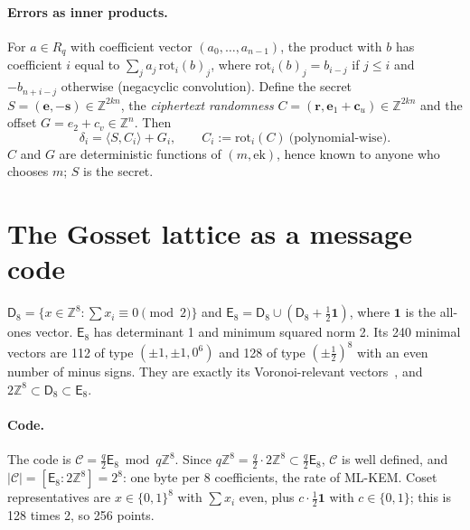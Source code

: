 \documentclass[11pt,a4paper]{article}
\theoremstyle{definition}
\theoremstyle{remark}
\newcommand{\Z}{\mathbb{Z}}
\newcommand{\E}{\mathsf{E}_8}
\newcommand{\D}{\mathsf{D}_8}
\newcommand{\rot}{\mathrm{rot}}
\begin{document}
\paragraph{Errors as inner products.} For $a\in R_q$ with coefficient vector $(a_0,\dots,a_{n-1})$, the product with $b$ has coefficient $i$ equal to $\sum_j a_j\,\rot_i(b)_j$, where $\rot_i(b)_j=b_{i-j}$ if $j\le i$ and $-b_{n+i-j}$ otherwise (negacyclic convolution). Define the secret $S=(\mathbf e,-\mathbf s)\in\Z^{2kn}$, the \emph{ciphertext randomness} $C=(\mathbf r,\mathbf e_1+\mathbf c_u)\in\Z^{2kn}$ and the offset $G=e_2+c_v\in\Z^n$. Then
\begin{equation}\label{eq:inner}
\delta_i=\langle S,C_i\rangle+G_i,\qquad C_i:=\rot_i(C)\ \text{(polynomial-wise)}.
\end{equation}
$C$ and $G$ are deterministic functions of $(m,\mathrm{ek})$, hence known to anyone who chooses $m$; $S$ is the secret.

\section{The Gosset lattice as a message code}\label{sec:lattice}

$\D=\{x\in\Z^8:\sum x_i\equiv0\pmod 2\}$ and $\E=\D\cup(\D+\tfrac12\mathbf 1)$, where $\mathbf 1$ is the all-ones vector. $\E$ has determinant 1 and minimum squared norm 2. Its 240 minimal vectors are 112 of type $(\pm1,\pm1,0^6)$ and 128 of type $(\pm\tfrac12)^8$ with an even number of minus signs. They are exactly its Voronoi-relevant vectors~\cite{conway}, and $2\Z^8\subset\D\subset\E$.

\paragraph{Code.} The code is $\mathcal C=\tfrac q2\E\bmod q\Z^8$. Since $q\Z^8=\tfrac q2\cdot2\Z^8\subset\tfrac q2\E$, $\mathcal C$ is well defined, and $|\mathcal C|=[\E:2\Z^8]=2^8$: one byte per 8 coefficients, the rate of ML-KEM. Coset representatives are $x\in\{0,1\}^8$ with $\sum x_i$ even, plus $c\cdot\tfrac12\mathbf 1$ with $c\in\{0,1\}$; this is 128 times 2, so 256 points.
\end{document}
